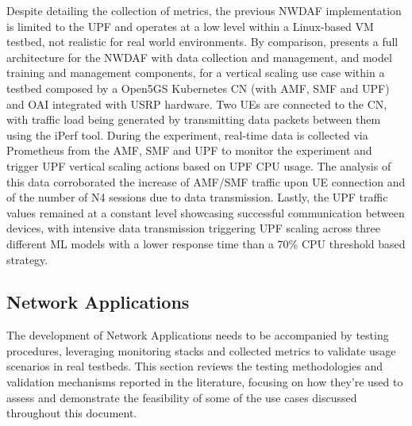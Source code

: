 Despite detailing the collection of metrics, the previous \acs{NWDAF} implementation is limited to the \acs{UPF} and operates at a low level within a Linux-based \acs{VM} testbed, not realistic for real world environments. By comparison, \cite{ExplorationNWDAFDevelopmentArchitecture6G} presents a full architecture for the \acs{NWDAF} with data collection and management, and model training and management components, for a vertical scaling use case within a testbed composed by a Open5GS Kubernetes \acs{CN} (with \acs{AMF}, \acs{SMF} and \acs{UPF}) and \acs{OAI} integrated with \acs{USRP} hardware. Two \acsp{UE} are connected to the \acs{CN}, with traffic load being generated by transmitting data packets between them using the iPerf tool. During the experiment, real-time data is collected via Prometheus from the \acs{AMF}, \acs{SMF} and \acs{UPF} to monitor the experiment and trigger \acs{UPF} vertical scaling actions based on \acs{UPF} \acs{CPU} usage. The analysis of this data corroborated the increase of \acs{AMF}/\acs{SMF} traffic upon \acs{UE} connection and of the number of N4 sessions due to data transmission. Lastly, the \acs{UPF} traffic values remained at a constant level showcasing  successful communication between devices, with intensive data transmission triggering \acs{UPF} scaling across three different \acs{ML} models with a lower response time than a 70\% \acs{CPU} threshold based strategy.


\subsection{Network Applications} \label{sec:testingandvalidation:netapps}

The development of Network Applications needs to be accompanied by testing procedures, leveraging monitoring stacks and collected metrics to validate usage scenarios in real testbeds. This section reviews the testing methodologies and validation mechanisms reported in the literature, focusing on how they're used to assess and demonstrate the feasibility of some of the use cases discussed throughout this document.

